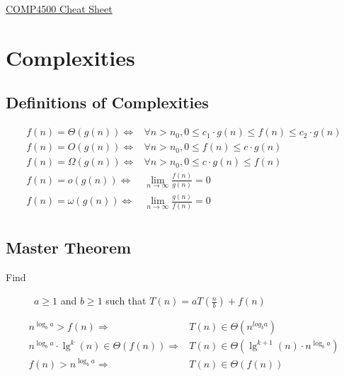 \documentclass[landscape]{cheat}
\begin{document}
\footnotesize
\begin{multicols*}{3}

\begin{center}
\Large{\underline{COMP4500 Cheat Sheet}} \\
\end{center}

\section{Complexities}

\subsection{Definitions of Complexities}
\begin{align*}
    f(n) = \Theta(g(n)) \Leftrightarrow& \forall n > n_0, 0 \leq c_1 \cdot g(n) \leq f(n) \leq c_2 \cdot g(n) \\
    f(n) = O(g(n)) \Leftrightarrow& \forall n > n_0, 0 \leq f(n) \leq c \cdot g(n) \\
    f(n) = \Omega(g(n)) \Leftrightarrow& \forall n > n_0, 0 \leq c \cdot g(n) \leq f(n) \\
    f(n) = o(g(n)) \Leftrightarrow& \lim_{n \rightarrow \infty} \frac {f(n)} {g(n)} = 0 \\
    f(n) = \omega(g(n)) \Leftrightarrow& \lim_{n \rightarrow \infty} \frac {g(n)} {f(n)} = 0 \\
\end{align*}

\subsection{Master Theorem}
\begin{description}
    \item[Find] $a \geq 1$ and $b \geq 1$ such that $T(n) = a T\left(\frac n b\right) + f(n)$
\end{description}
\begin{align*}
    n^{\log_b a} > f(n) \Rightarrow& T(n) \in \Theta(n^{log_b a}) \\
    n^{\log_b a} \cdot \lg^k(n) \in \Theta(f(n)) \Rightarrow& T(n) \in \Theta(\lg^{k+1}(n) \cdot n^{\log_b a}) \\
    f(n) > n^{\log_b a} \Rightarrow& T(n) \in \Theta(f(n)) \\
\end{align*}


\end{multicols*}
\end{document}
